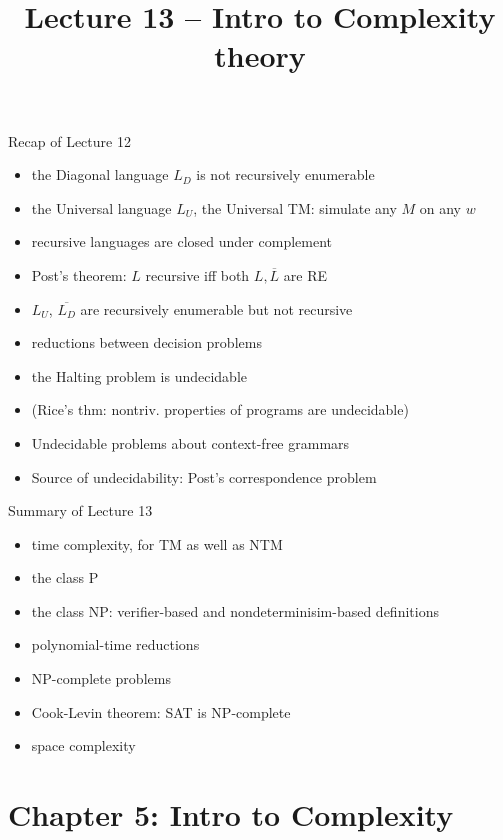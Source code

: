 \documentclass[handout]{beamer}
\title{Lecture 13 -- Intro to Complexity theory}
\begin{document}
\frame{\titlepage}


\begin{frame}{Recap of Lecture 12}

    \begin{itemize}
        \item the Diagonal language $L_D$ is not recursively enumerable
        \item the Universal language $L_U$, the Universal TM: simulate any $M$ on any $w$
        \item recursive languages are closed under complement
        \item Post's theorem: $L$ recursive iff both $L,\overline{L}$ are RE
        \item $L_U$, $\overline{L_D}$ are recursively enumerable but not recursive
        \item reductions between decision problems
        \item the Halting problem is undecidable        
        \item (Rice's thm: nontriv. properties of programs are undecidable)
        \item Undecidable problems about context-free grammars
        \item Source of undecidability: Post's correspondence problem
    \end{itemize}

\end{frame}


\begin{frame}{Summary of Lecture 13}

    \begin{itemize}
        \item time complexity, for TM as well as NTM
        \item the class P
        \item the class NP: verifier-based and nondeterminisim-based definitions
        \item polynomial-time reductions
        \item NP-complete problems
        \item Cook-Levin theorem: SAT is NP-complete
        \item space complexity
    \end{itemize}

\end{frame}


\section{\sc Chapter 5: Intro to Complexity}
\end{document}
